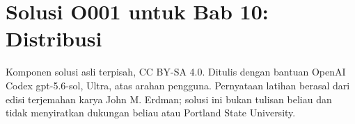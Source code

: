 
\section*{Solusi O001 untuk Bab 10: Distribusi}
\begin{center}
\small
Komponen solusi asli terpisah, CC BY-SA 4.0. Ditulis dengan bantuan
OpenAI Codex gpt-5.6-sol, Ultra, atas arahan pengguna. Pernyataan latihan
berasal dari edisi terjemahan karya John M. Erdman; solusi ini bukan tulisan
beliau dan tidak menyiratkan dukungan beliau atau Portland State University.
\end{center}

